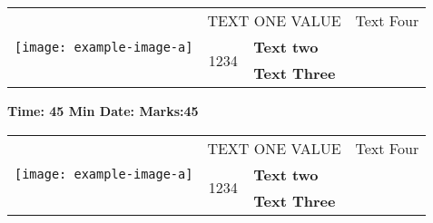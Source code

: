
\usepackage[margin=1in,headheight=5\baselineskip,headsep=1\baselineskip,includehead]{geometry}
\usepackage{tabularx}
\usepackage{graphicx}
\usepackage{multirow}
\newlength{\headerwidth}
\setlength{\headerwidth}{\textwidth}
\newsavebox{\myheader}
\begin{lrbox}{\myheader}%
    \begin{minipage}[b]{\headerwidth}
    \renewcommand{\arraystretch}{1.29}%
    \begin{tabularx}{\headerwidth}{|@{}c@{}|c|X|c|}\hline
    \multirow{3}{*}{\texttt{[image: example-image-a]}}
                                                & \multicolumn{2}{c|}{ TEXT ONE VALUE }                 & Text Four \\\cline{2-3}
                                                & \multirow{2}{*}{1234} & \centering\textbf{Text two}   &           \\\cline{3-3}
                                                &                       & \centering\textbf{Text Three} &           \\\hline
    \end{tabularx}
    \par
    \bfseries
    Time: 45 Min \hspace*{\fill} 
    Date:        \hspace*{\fill}
    Marks:45
    \end{minipage}
\end{lrbox}
\newsavebox{\myfooter}
\begin{lrbox}{\myfooter}%
    \begin{minipage}[b]{\headerwidth}
    \renewcommand{\arraystretch}{1.29}%
    \begin{tabularx}{\headerwidth}{|@{}c@{}|c|X|c|}\hline
    \multirow{3}{*}{\texttt{[image: example-image-a]}}
                                                & \multicolumn{2}{c|}{ TEXT ONE VALUE }                 & Text Four \\\cline{2-3}
                                                & \multirow{2}{*}{1234} & \centering\textbf{Text two}   &           \\\cline{3-3}
                                                &                       & \centering\textbf{Text Three} &           \\\hline
    \end{tabularx}
    \end{minipage}
\end{lrbox}

\usepackage{fancyhdr}
\pagestyle{fancy}
\renewcommand{\headrulewidth}{0pt}
\renewcommand{\footrulewidth}{0pt}
\lhead{}
\chead{\usebox{\myheader}}
\rhead{}
\lfoot{}
\cfoot{\usebox{\myfooter}}
\rfoot{}
